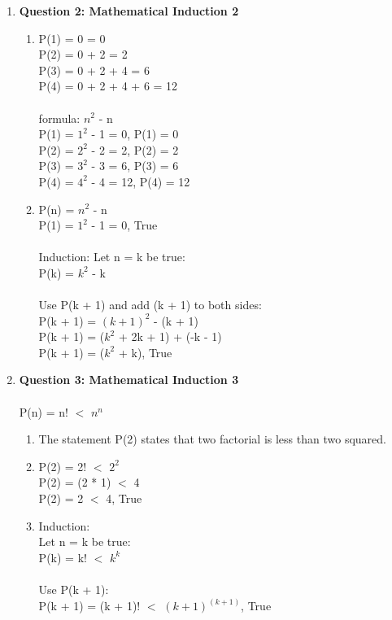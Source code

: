 \documentclass[11pt]{article}
\begin{document}
\begin{enumerate}
\item
\textbf{Question 2: Mathematical Induction 2} %
\begin{enumerate}[label=(\alph*)]
\item %
P(1) = 0 = 0 \\ 
P(2) = 0 + 2 = 2 \\
P(3) = 0 + 2 + 4 = 6 \\
P(4) = 0 + 2 + 4 + 6 = 12 \\ 
\\
formula: $n^{2}$ - n \\
P(1) = $1^{2}$ - 1 = 0, P(1) = 0 \\
P(2) = $2^{2}$ - 2 = 2, P(2) = 2 \\
P(3) = $3^{2}$ - 3 = 6, P(3) = 6 \\
P(4) = $4^{2}$ - 4 = 12, P(4) = 12 \\

\item %
P(n) = $n^{2}$ - n \\
P(1) = $1^{2}$ - 1 = 0, True \\
\\
Induction:
Let n = k be true: \\
P(k) = $k^{2}$ - k \\
\\
Use P(k + 1) and add (k + 1) to both sides: \\
P(k + 1) = $(k + 1)^{2}$ - (k + 1) \\
P(k + 1) = ($k^{2}$ + 2k + 1) + (-k - 1) \\
P(k + 1) = ($k^{2}$ + k), True \\
\end{enumerate}

\item
\textbf{Question 3: Mathematical Induction 3} \\ \\ %
P(n) = n! $<$ $n^{n}$
\begin{enumerate}[label=(\alph*)]
\item %
The statement P(2) states that two factorial is less than two squared. \\

\item %
P(2) = 2! $<$ $2^{2}$ \\
P(2) = (2 * 1) $<$ 4 \\
P(2) = 2 $<$ 4, True \\

\item %
Induction: \\
Let n = k be true: \\
P(k) = k! $<$ $k^{k}$ \\
\\
Use P(k + 1): \\
P(k + 1) = (k + 1)! $<$ $(k + 1)^{(k + 1)}$, True \\
\end {enumerate}

\end{enumerate}
\end{document}
